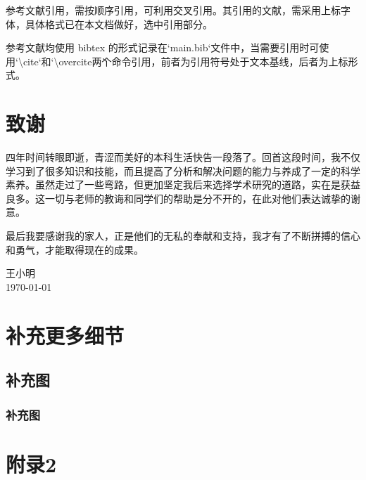 ﻿\documentclass{scutthesis} %
\begin{document}
参考文献引用，需按顺序引用，可利用交叉引用。其引用的文献，需采用上标字体，具体格式已在本文档做好，选中引用部分。

参考文献均使用 bibtex 的形式记录在`main.bib`文件中，当需要引用时可使用`\textbackslash cite`和`\textbackslash overcite\`两个命令引用，前者为引用符号处于文本基线，后者为上标形式。


\newpage

\backmatter
\renewcommand{\chaptermark}[1]{\markboth{\songti #1}{}}
\chapter{致谢}

四年时间转眼即逝，青涩而美好的本科生活快告一段落了。回首这段时间，我不仅学习到了很多知识和技能，而且提高了分析和解决问题的能力与养成了一定的科学素养。虽然走过了一些弯路，但更加坚定我后来选择学术研究的道路，实在是获益良多。这一切与老师的教诲和同学们的帮助是分不开的，在此对他们表达诚挚的谢意。

最后我要感谢我的家人，正是他们的无私的奉献和支持，我才有了不断拼搏的信心和勇气，才能取得现在的成果。

\vskip 108pt
\begin{flushright}
    王小明\makebox[1cm]{} \\
    \today
\end{flushright}

\newpage
\makereferences
\newpage
\appendix
\renewcommand{\chaptermark}[1]{\markboth{\songti  附录\thechapter\ ~#1}{}}

\chapter{补充更多细节}

\section{补充图}

\subsection{补充图}

\newclearpage
\chapter{附录2}
\end{document}
